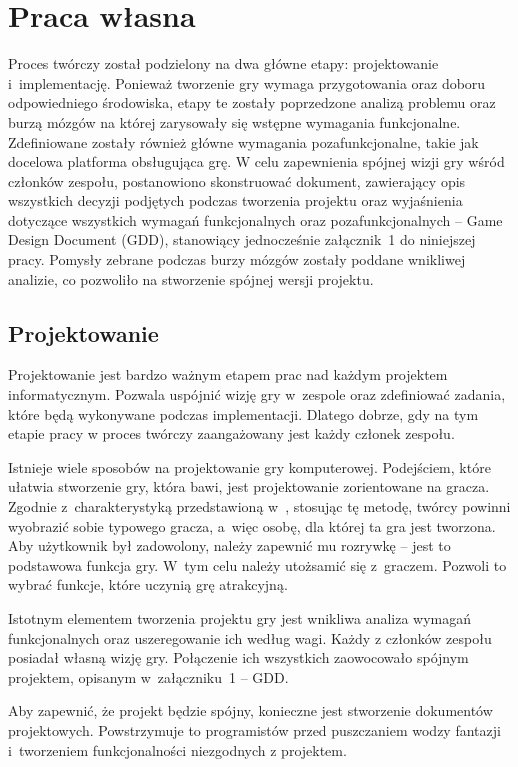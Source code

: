 \chapter{Praca własna}
Proces twórczy został podzielony na dwa główne etapy: projektowanie i~implementację. Ponieważ tworzenie gry wymaga przygotowania oraz doboru odpowiedniego środowiska, etapy te zostały poprzedzone analizą problemu oraz burzą mózgów na której zarysowały się wstępne wymagania funkcjonalne. Zdefiniowane zostały również główne wymagania pozafunkcjonalne, takie jak docelowa platforma obsługująca grę. W celu zapewnienia spójnej wizji gry wśród członków zespołu, postanowiono skonstruować dokument, zawierający opis wszystkich decyzji podjętych podczas tworzenia projektu oraz wyjaśnienia dotyczące wszystkich wymagań funkcjonalnych oraz pozafunkcjonalnych -- Game Design Document (GDD), stanowiący jednocześnie załącznik~1 do niniejszej pracy.  Pomysły zebrane podczas burzy mózgów zostały poddane wnikliwej analizie, co pozwoliło na stworzenie spójnej wersji projektu. 

\section{Projektowanie}
Projektowanie jest bardzo ważnym etapem prac nad każdym projektem informatycznym. Pozwala uspójnić wizję gry w~zespole oraz zdefiniować zadania, które będą wykonywane podczas implementacji. Dlatego dobrze, gdy na tym etapie pracy w proces twórczy zaangażowany jest każdy członek zespołu. 

Istnieje wiele sposobów na projektowanie gry komputerowej. Podejściem, które ułatwia stworzenie gry, która bawi, jest projektowanie zorientowane na gracza. Zgodnie z~charakterystyką przedstawioną w~\cite{Adams:pgp}, stosując tę metodę, twórcy powinni wyobrazić sobie typowego gracza, a~więc osobę, dla której ta gra jest tworzona. Aby użytkownik był zadowolony, należy zapewnić mu rozrywkę -- jest to podstawowa funkcja gry. W~tym celu należy utożsamić się z~graczem. Pozwoli to wybrać funkcje, które uczynią grę atrakcyjną.

Istotnym elementem tworzenia projektu gry jest wnikliwa analiza wymagań funkcjonalnych oraz uszeregowanie ich według wagi. Każdy z członków zespołu posiadał własną wizję gry. Połączenie ich wszystkich zaowocowało spójnym projektem, opisanym w~załączniku~1 -- GDD. 

Aby zapewnić, że projekt będzie spójny, konieczne jest stworzenie dokumentów projektowych. Powstrzymuje to programistów przed puszczaniem wodzy fantazji i~tworzeniem funkcjonalności niezgodnych z projektem. 

